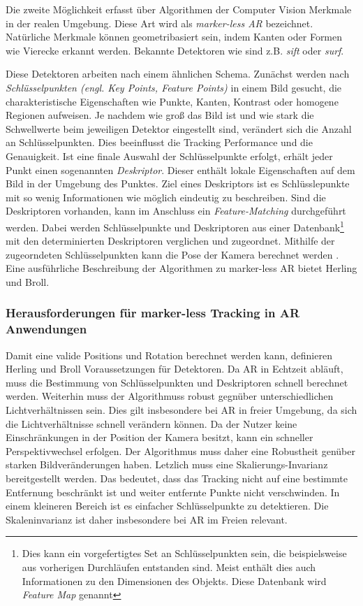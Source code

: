 Die zweite Möglichkeit erfasst über Algorithmen der Computer Vision Merkmale in der realen Umgebung. Diese Art wird als \textit{marker-less AR} bezeichnet. Natürliche Merkmale können geometribasiert sein, indem Kanten oder Formen wie Vierecke erkannt werden. Bekannte Detektoren wie sind z.B. \textit{\acrfull{sift}}\cite{lowe1999} oder \textit{\acrfull{surf}}\cite{bay2008}. 

Diese Detektoren arbeiten nach einem ähnlichen Schema. Zunächst werden nach \textit{Schlüsselpunkten (engl. Key Points, Feature Points)} in einem Bild gesucht, die charakteristische Eigenschaften wie Punkte, Kanten, Kontrast oder homogene Regionen aufweisen.  Je nachdem wie groß das Bild ist und wie stark die Schwellwerte beim jeweiligen Detektor eingestellt sind, verändert sich die Anzahl an Schlüsselpunkten. Dies beeinflusst die Tracking Performance und die Genauigkeit. 
Ist eine finale Auswahl der Schlüsselpunkte erfolgt, erhält jeder Punkt einen sogenannten \textit{Deskriptor}. Dieser enthält lokale Eigenschaften auf dem Bild in der Umgebung des Punktes. Ziel eines Deskriptors ist es Schlüsslepunkte mit so wenig Informationen wie möglich eindeutig zu beschreiben. 
Sind die Deskriptoren vorhanden, kann im Anschluss ein \textit{Feature-Matching} durchgeführt werden. Dabei werden Schlüsselpunkte und Deskriptoren aus einer Datenbank\footnote{Dies kann ein vorgefertigtes Set an Schlüsselpunkten sein, die beispielsweise aus vorherigen Durchläufen entstanden sind. Meist enthält dies auch Informationen zu den Dimensionen des Objekts. Diese Datenbank wird \textit{Feature Map} genannt} mit den determinierten Deskriptoren verglichen und zugeordnet. Mithilfe der zugeorndeten Schlüsselpunkten kann die Pose der Kamera berechnet werden \cite[][]{doerner}\cite{herling2011}. Eine ausführliche Beschreibung der Algorithmen zu marker-less AR bietet Herling und Broll\cite{herling2011}.

\subsubsection*{Herausforderungen für marker-less Tracking in AR Anwendungen}

Damit eine valide Positions und Rotation berechnet werden kann, definieren Herling und Broll\cite{herling2011} Voraussetzungen für Detektoren. Da AR in Echtzeit abläuft, muss die Bestimmung von Schlüsselpunkten und Deskriptoren schnell berechnet werden. Weiterhin muss der Algorithmuss robust gegnüber unterschiedlichen Lichtverhältnissen sein. Dies gilt insbesondere bei AR in freier Umgebung, da sich die Lichtverhältnisse schnell verändern können. Da der Nutzer keine Einschränkungen in der Position der Kamera besitzt, kann ein schneller Perspektivwechsel erfolgen. Der Algorithmus muss daher eine Robustheit genüber starken Bildveränderungen haben. Letzlich muss eine Skalierungs-Invarianz bereitgestellt werden. Das bedeutet, dass das Tracking nicht auf eine bestimmte Entfernung beschränkt ist und weiter entfernte Punkte nicht verschwinden. In einem kleineren Bereich ist es einfacher Schlüsselpunkte zu detektieren. Die Skaleninvarianz ist daher insbesondere bei AR im Freien relevant.


